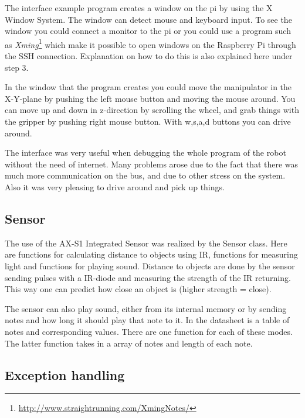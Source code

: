 The interface example program creates a window on the pi by using the X Window System. The window can detect mouse and keyboard input. To see the window you could connect a monitor to the pi or you could use a program such as \textit{Xming}\footnote{\url{http://www.straightrunning.com/XmingNotes/}} which make it possible to open windows on the Raspberry Pi through the SSH connection. Explanation on how to do this is also explained here \citep{direct-Pi} under step 3.

In the window that the program creates you could move the manipulator in the X-Y-plane by pushing the left mouse button and moving the mouse around. You can move up and down in z-direction by scrolling the wheel, and grab things with the gripper by pushing right mouse button. With w,s,a,d buttons you can drive  around.

The interface was very useful when debugging the whole program of the robot without the need of internet. Many problems arose due to the fact that there was much more communication on the bus, and due to other stress on the system. Also it was very pleasing to drive around and pick up things. 

\subsection{Sensor}

The use of the AX-S1 Integrated Sensor was realized by the Sensor class. Here are functions for calculating distance to objects using IR, functions for measuring light and functions for playing sound. Distance to objects are done by the sensor sending pulses with a IR-diode and measuring the strength of the IR returning. This way one can predict how close an object is (higher strength = close). 

The sensor can also play sound, either from its internal memory or by sending notes and how long it should play that note to it. In the datasheet is a table of notes and corresponding values. There are one function for each of these modes. The latter function takes in a array of notes and length of each note.

\subsection{Exception handling}


